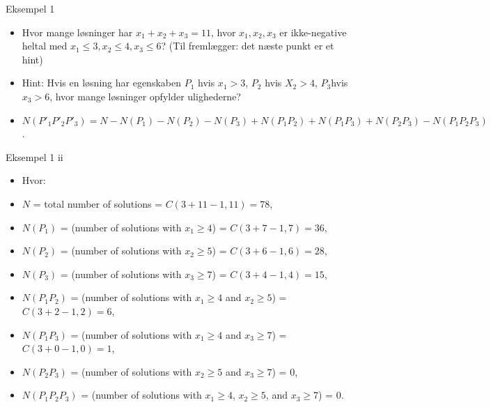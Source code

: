 \documentclass{beamer}
\begin{document}
\begin{frame}{Eksempel 1}
   \begin{itemize}
        \item<1-> Hvor mange løsninger har $x_1 + x_2 + x_3 = 11$, hvor $x_1, x_2, x_3$ er ikke-negative heltal med $x_1 \leq 3, x_2 \leq 4, x_3 \leq 6$?
        (Til fremlægger: det næste punkt er et hint)
        \item<2-> Hint: Hvis en løsning har egenskaben $P_1$ hvis $x_1 > 3$, $P_2$ hvis $X_2 > 4$, $P_3$hvis $x_3 > 6$, hvor mange løsninger opfylder ulighederne? 
        \item<3-> $N(P'_1P'_2P'_3) = N - N(P_1) - N(P_2)-N(P_3) + N(P_1P_2) + N(P_1P_3)+N(P_2P_3) - N(P_1P_2P_3)$.
   \end{itemize} 
\end{frame}
\begin{frame}{Eksempel 1 ii}
   \begin{itemize}
        \item Hvor: 
        \item \( N \) = total number of solutions = \( C(3 + 11 - 1, 11) = 78 \),
        \item \( N(P_1) \) = (number of solutions with \( x_1 \geq 4 \)) = \( C(3 + 7 - 1, 7) = 36 \),
        \item \( N(P_2) \) = (number of solutions with \( x_2 \geq 5 \)) = \( C(3 + 6 - 1, 6) = 28 \),
        \item \( N(P_3) \) = (number of solutions with \( x_3 \geq 7 \)) = \( C(3 + 4 - 1, 4) = 15 \),
        \item \( N(P_1 P_2) \) = (number of solutions with \( x_1 \geq 4 \) and \( x_2 \geq 5 \)) = \( C(3 + 2 - 1, 2) = 6 \),
        \item \( N(P_1 P_3) \) = (number of solutions with \( x_1 \geq 4 \) and \( x_3 \geq 7 \)) = \( C(3 + 0 - 1, 0) = 1 \),
        \item \( N(P_2 P_3) \) = (number of solutions with \( x_2 \geq 5 \) and \( x_3 \geq 7 \)) = 0,
        \item \( N(P_1 P_2 P_3) \) = (number of solutions with \( x_1 \geq 4 \), \( x_2 \geq 5 \), and \( x_3 \geq 7 \)) = 0.
   \end{itemize} 
\end{frame}
\end{document}
